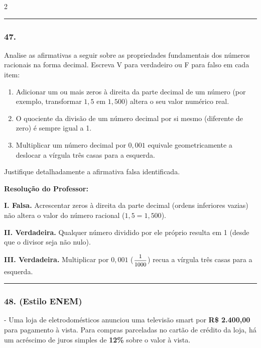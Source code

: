 \begin{multicols*}{2}
\noindent\textcolor{CorLinha}{\rule{\linewidth}{0.5pt}} 
\par\vspace{\espacoPreQuestao}
\subsubsection*{47.} Analise as afirmativas a seguir sobre as propriedades fundamentais dos números racionais na forma decimal. Escreva V para verdadeiro ou F para falso em cada item:
\begin{enumerate}[label=\Roman*., itemsep=\espacoAlt]
    \item Adicionar um ou mais zeros à direita da parte decimal de um número (por exemplo, transformar $1,5$ em $1,500$) altera o seu valor numérico real.
    \item O quociente da divisão de um número decimal por si mesmo (diferente de zero) é sempre igual a 1.
    \item Multiplicar um número decimal por $0,001$ equivale geometricamente a deslocar a vírgula três casas para a esquerda.
\end{enumerate}
Justifique detalhadamente a afirmativa falsa identificada.

\ifgabarito
    \begin{tcolorbox}[colback=CorTitUm!5, colframe=CorTitUm, boxrule=1pt, arc=4pt, left=6pt, right=6pt, top=6pt, bottom=6pt]
    \small\textbf{\textcolor{CorTitUm}{Resolução do Professor:}}\par\vspace{0.1cm}
    \color{CinzaEscuro}
    \textbf{I. Falsa.} Acrescentar zeros à direita da parte decimal (ordens inferiores vazias) não altera o valor do número racional ($1,5 = 1,500$).
    
    \textbf{II. Verdadeira.} Qualquer número dividido por ele próprio resulta em 1 (desde que o divisor seja não nulo).
    
    \textbf{III. Verdadeira.} Multiplicar por $0,001$ ($\mfrac{1}{1000}$) recua a vírgula três casas para a esquerda.
    \end{tcolorbox}
\fi

\par\vspace{\espacoQuestao}

\noindent\textcolor{CorLinha}{\rule{\linewidth}{0.5pt}} 
\par\vspace{\espacoPreQuestao}
\subsubsection*{48. (Estilo ENEM)} - Uma loja de eletrodomésticos anunciou uma televisão smart por \textbf{R\$ 2.400,00} para pagamento à vista. Para compras parceladas no cartão de crédito da loja, há um acréscimo de juros simples de \textbf{12\%} sobre o valor à vista.


\end{multicols*}
